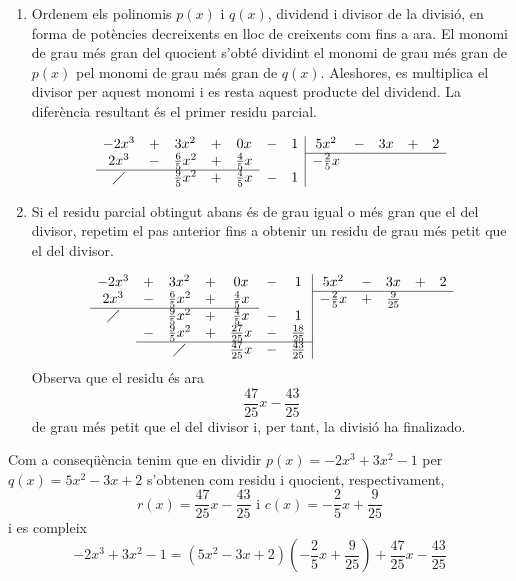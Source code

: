 \begin{enumerate}
\item Ordenem els polinomis $p(x)$ i $q(x)$, dividend i divisor de la
divisió, en forma de potències decreixents en lloc de creixents com
fins a ara. El monomi de grau més gran del quocient s’obté dividint el
monomi de grau més gran de $p(x)$ pel monomi de grau més gran de $q(x)$.
Aleshores, es multiplica el divisor per aquest monomi i es resta aquest producte
del dividend. La diferència resultant és el primer residu parcial.

\begin{equation*}
\begin{array}{ccccccc|ccccc}
-2x^{3} & + & 3x^{2} & + & 0x & - & 1 & 5x^{2} & - & 3x & + & 2 \\
\cline{8-12}
2x^{3} & - & \frac{6}{5}x^{2} & + & \frac{4}{5}x & & & -\frac{2}{5}x & &
& & \\ \cline{1-5}
\diagup & & \frac{9}{5}x^{2} & + & \frac{4}{5}x & - & 1 & & & & &
\end{array}\end{equation*}

\item Si el residu parcial obtingut abans és de grau igual o més gran que el
del divisor, repetim el pas anterior fins a obtenir un residu de grau
més petit que el del divisor.

\begin{equation*}
\begin{array}{ccccccc|ccccc}
-2x^{3} & + & 3x^{2} & + & 0x & - & 1 & 5x^{2} & - & 3x & + & 2 \\
\cline{8-12}
2x^{3} & - & \frac{6}{5}x^{2} & + & \frac{4}{5}x & & & -\frac{2}{5}x & + &
\frac{9}{25} & & \\ \cline{1-5}
\diagup & & \frac{9}{5}x^{2} & + & \frac{4}{5}x & - & 1 & & & & & \\
& - & \frac{9}{5}x^{2} & + & \frac{27}{25}x & - & \frac{18}{25} & & & &
& \\ \cline{2-7}
& & \diagup & & \frac{47}{25}x & - & \frac{43}{25} & & & & &
\end{array}\end{equation*}Observa que el residu és ara\begin{equation*}
\frac{47}{25}x-\frac{43}{25}
\end{equation*}de grau més petit que el del divisor i, per tant, la divisió ha
finalizado.
\end{enumerate}

Com a conseqüència tenim que en dividir $p(x)=-2x^{3}+3x^{2}-1$ per $q(x)=5x^{2}-3x+2$ s'obtenen com residu i quocient, respectivament,\begin{equation*}
r(x)=\frac{47}{25}x-\frac{43}{25}\text{ \ \ \ i \ \ \ }c(x)=-\frac{2}{5}x+\frac{9}{25}
\end{equation*}i es compleix\begin{equation*}
-2x^{3}+3x^{2}-1=(5x^{2}-3x+2)\left( -\frac{2}{5}x+\frac{9}{25}\right) +\frac{47}{25}x-\frac{43}{25}
\end{equation*}

